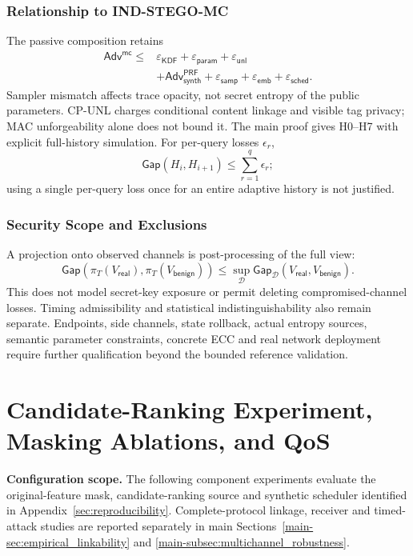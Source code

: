 \documentclass[journal]{IEEEtran}
\theoremstyle{definition}
\theoremstyle{game}
\begin{document}
\subsubsection{Relationship to IND-STEGO-MC}
The passive composition retains
\begin{align}
\mathsf{Adv}^{\mathsf{mc}}\le{}&
\varepsilon_{\mathsf{KDF}}+\varepsilon_{\mathsf{param}}+\varepsilon_{\mathsf{unl}}
\nonumber\\
&+\mathsf{Adv}^{\mathsf{PRF}}_{\mathsf{synth}}+\varepsilon_{\mathsf{samp}}
+\varepsilon_{\mathsf{emb}}+\varepsilon_{\mathsf{sched}}.
\end{align}
Sampler mismatch affects trace opacity, not secret entropy of the public
parameters. CP-UNL charges conditional content linkage and visible tag
privacy; MAC unforgeability alone does not bound it. The main proof gives
H0--H7 with explicit full-history simulation. For per-query losses $\epsilon_r$,
\[
\mathsf{Gap}(H_i,H_{i+1})\le\sum_{r=1}^{q}\epsilon_r;
\]
using a single per-query loss once for an entire adaptive history is not justified.

\subsubsection{Security Scope and Exclusions}
A projection onto observed channels is post-processing of the full view:
\[
\mathsf{Gap}(\pi_T(V_{\mathsf{real}}),\pi_T(V_{\mathsf{benign}}))
\le\sup_{\mathcal D}\mathsf{Gap}_{\mathcal D}(V_{\mathsf{real}},V_{\mathsf{benign}}).
\]
This does not model secret-key exposure or permit deleting compromised-channel
losses. Timing admissibility and statistical indistinguishability also remain
separate. Endpoints, side channels, state rollback, actual entropy sources,
semantic parameter constraints, concrete ECC and real network deployment
require further qualification beyond the bounded reference validation.


\section{Candidate-Ranking Experiment, Masking Ablations, and QoS}
\noindent\textbf{Configuration scope.} The following component experiments
evaluate the original-feature mask, candidate-ranking source and synthetic
scheduler identified in Appendix~\ref{sec:reproducibility}. Complete-protocol
linkage, receiver and timed-attack studies are reported separately in main
Sections~\ref{main-sec:empirical_linkability} and
\ref{main-subsec:multichannel_robustness}.
 \label{Candidate-Ranking Experiment, Masking Ablations, and QoS}
\end{document}
